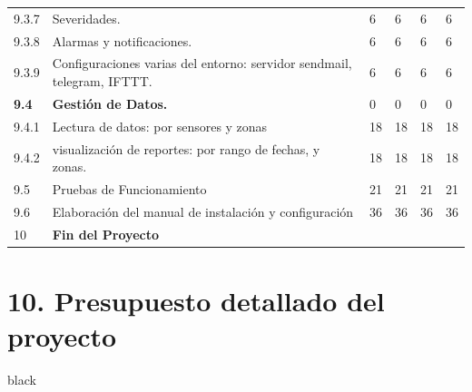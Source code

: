 \documentclass[11pt]{charter}
\begin{document}
\begin{tabularx}{\linewidth}{@{}|p{2cm}|p{11cm}|p{2.5cm}|p{2.5cm}|p{2.5cm}|p{2.5cm}|@{}}
9.3.7          & Severidades.                                                                                  & 6    & 6    & 6    & 6    \\
9.3.8          & Alarmas y notificaciones.                                                                     & 6    & 6    & 6    & 6    \\
9.3.9          & Configuraciones varias del   entorno: servidor sendmail, telegram, IFTTT.                     & 6    & 6    & 6    & 6    \\
\textbf{9.4}   & \textbf{Gestión de Datos.}                                                                    & 0    & 0    & 0    & 0    \\
9.4.1          & Lectura de datos: por sensores y   zonas                                                      & 18   & 18   & 18   & 18   \\
9.4.2          & visualización de reportes: por   rango de fechas,  y zonas.                                   & 18   & 18   & 18   & 18   \\
9.5            & Pruebas de Funcionamiento                                                                     & 21   & 21   & 21   & 21   \\
9.6            & Elaboración del manual de   instalación y configuración                                       & 36   & 36   & 36   & 36   \\
10             & \textbf{Fin del Proyecto}                                                                     &      &      &      &  

\end{tabularx}
\clearpage


\newpage
{}
\recalctypearea
\vspace*{1px}


\section{10. Presupuesto detallado del proyecto}
\label{sec:presupuesto}

\begin{consigna}{black}
%

\end{consigna}
\end{document}
